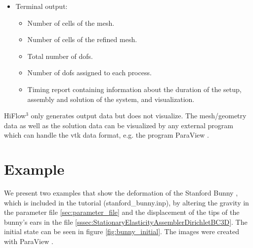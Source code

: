 \documentclass[a4paper, 11pt, twoside]{article}
\theoremstyle{plain}
\theoremstyle{definition}
\begin{document}
\begin{itemize}
  \item Terminal output: 
    \begin{itemize}
      \item Number of cells of the mesh.
      \item Number of cells of the refined mesh.
      \item Total number of dofs.
      \item Number of dofs assigned to each process.
      \item Timing report containing information about the duration of the setup, assembly and solution of the system, and visualization. 
    \end{itemize}
\end{itemize}




HiFlow$^3$ only generates output data but does not visualize. 
The mesh/geometry data as well as the solution data can be visualized by any external program which can handle the vtk data format, e.g. the program ParaView \cite{Paraview}.







\section{Example}
\label{sec:example}

We present two examples that show the deformation of the Stanford Bunny \cite{stanford_bunny}, which is included in the tutorial (stanford\_bunny.inp), by altering the gravity in the parameter file \ref{sec:parameter_file} and the displacement of the tips of the bunny's ears in the file \ref{sssec:StationaryElasticityAssemblerDirichletBC3D}.
The initial state can be seen in figure \ref{fig:bunny_initial}.
The images were created with ParaView \cite{Paraview}.
\end{document}

